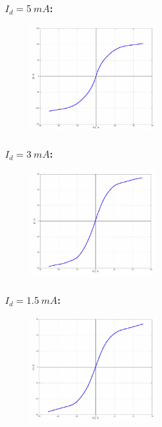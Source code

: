 \documentclass[11pt]{article}
\begin{document}
\subsubsection*{\(I_d = 5\: mA\):}


\begin{figure}[H]
    \centering
    \includegraphics[width=0.5\textwidth]{V-A-5.png}
\end{figure}

\subsubsection*{\(I_d = 3\: mA\):}
\begin{figure}[H]
    \centering
    \includegraphics[width=0.5\textwidth]{V-A-3.png}
\end{figure}

\subsubsection*{\(I_d = 1.5\: mA\):}
\begin{figure}[H]
    \centering
    \includegraphics[width=0.5\textwidth]{V-A-1.5.png}
\end{figure}
\end{document}
